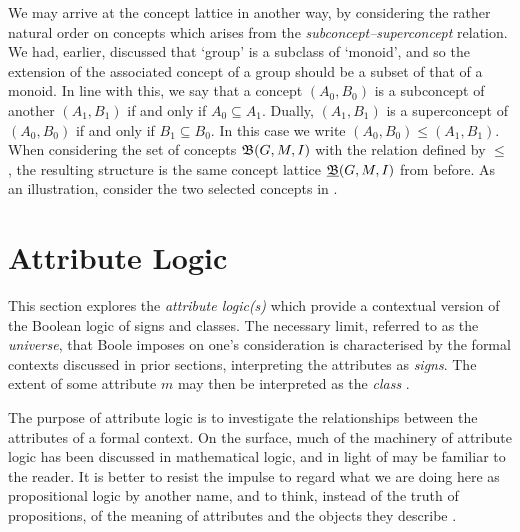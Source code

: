 We may arrive at the concept lattice in another way, by considering the rather natural order on concepts which arises
from the \textit{subconcept--superconcept} relation. We had, earlier, discussed that `group' is a subclass of `monoid', and
so the extension of the associated concept of a group should be a subset of that of a monoid. In line with this, we say that
a concept $(A_{0},B_{0})$ is a subconcept of another $(A_{1},B_{1})$ if and only if $A_{0}\subseteq A_{1}$. Dually, $(A_{1}
,B_{1})$ is a superconcept of $(A_{0},B_{0})$ if and only if $B_{1}\subseteq B_{0}$. In this case we write
$(A_{0},B_{0}) \leq (A_{1},B_{1})$. When considering the set of concepts ${\mathfrak B} (G,M,\mathrel{I})$ with the relation defined by $\leq$,
the resulting structure is the same concept lattice $\underline{{\mathfrak B}} (G,M,\mathrel{I})$ from before. As an illustration, consider the two selected
concepts in .


\section{Attribute Logic}
\label{section:attribute-logic}

This section explores the \textit{attribute logic(s)} \cite{ganter1999contextual,ganter2025language} which provide a contextual
version of the Boolean logic of signs and classes. The necessary limit, referred to as the \textit{universe}, that Boole
imposes on one's consideration is characterised by the formal contexts discussed in prior sections, interpreting the
attributes as \textit{signs}. The extent of some attribute $m$ may then be interpreted as the \textit{class} \cite{Wille2000}.

The purpose of attribute logic is to investigate the relationships between the attributes of a formal context. On the
surface, much of the machinery of attribute logic has been discussed in mathematical logic, and in light of
 may be familiar to the reader. It is better to resist the impulse to regard what we are
doing here as propositional logic by another name, and to think, instead of the truth of propositions, of the meaning of
attributes and the objects they describe \cite{ganter2025language}.

